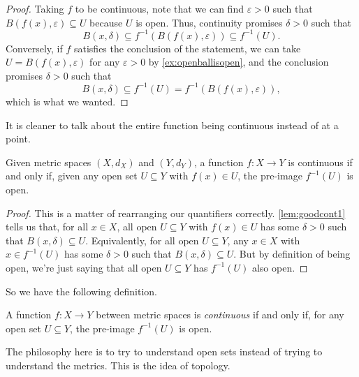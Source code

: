 \documentclass[../notes.tex]{subfiles}
\begin{document}
\begin{proof}
	Taking $f$ to be continuous, note that we can find $\varepsilon>0$ such that $B(f(x),\varepsilon)\subseteq U$ because $U$ is open. Thus, continuity promises $\delta>0$ such that
	\[B(x,\delta)\subseteq f^{-1}(B(f(x),\varepsilon))\subseteq f^{-1}(U).\]
	Conversely, if $f$ satisfies the conclusion of the statement, we can take $U=B(f(x),\varepsilon)$ for any $\varepsilon>0$ by \autoref{ex:openballisopen}, and the conclusion promises $\delta>0$ such that
	\[B(x,\delta)\subseteq f^{-1}(U)=f^{-1}(B(f(x),\varepsilon)),\]
	which is what we wanted.
\end{proof}
It is cleaner to talk about the entire function being continuous instead of at a point.
\begin{lemma}
	Given metric spaces $(X,d_X)$ and $(Y,d_Y)$, a function $f\colon X\to Y$ is continuous if and only if, given any open set $U\subseteq Y$ with $f(x)\in U$, the pre-image $f^{-1}(U)$ is open.
\end{lemma}
\begin{proof}
	This is a matter of rearranging our quantifiers correctly. \autoref{lem:goodcont1} tells us that, for all $x\in X$, all open $U\subseteq Y$ with $f(x)\in U$ has some $\delta>0$ such that $B(x,\delta)\subseteq U$. Equivalently, for all open $U\subseteq Y$, any $x\in X$ with $x\in f^{-1}(U)$ has some $\delta>0$ such that $B(x,\delta)\subseteq U$. But by definition of being open, we're just saying that all open $U\subseteq Y$ has $f^{-1}(U)$ also open.
\end{proof}
So we have the following definition.
\begin{definition}[Continuous]
	A function $f\colon X\to Y$ between metric spaces is \textit{continuous} if and only if, for any open set $U\subseteq Y$, the pre-image $f^{-1}(U)$ is open.
\end{definition}
The philosophy here is to try to understand open sets instead of trying to understand the metrics. This is the idea of topology.
\end{document}
